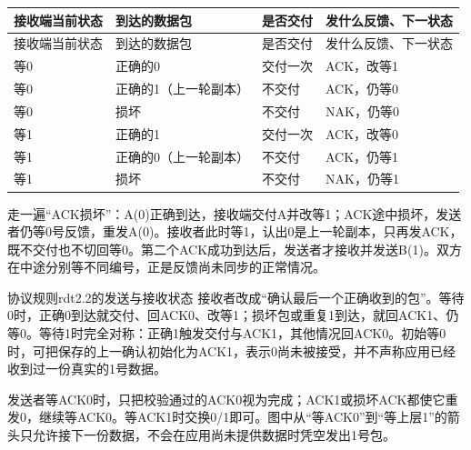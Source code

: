 \begingroup
\small\setlength{\tabcolsep}{3pt}
\renewcommand{\arraystretch}{1.22}
\begin{longtable}{@{}>{\raggedright\arraybackslash}p{}>{\raggedright\arraybackslash}p{}>{\raggedright\arraybackslash}p{}>{\raggedright\arraybackslash}p{}@{}}
\toprule
接收端当前状态 & 到达的数据包 & 是否交付 & 发什么反馈、下一状态 \\
\midrule\endfirsthead
接收端当前状态 & 到达的数据包 & 是否交付 & 发什么反馈、下一状态 \\
\midrule\endhead
\bottomrule\endfoot
等0 & 正确的0 & 交付一次 & ACK，改等1 \\
等0 & 正确的1（上一轮副本） & 不交付 & ACK，仍等0 \\
等0 & 损坏 & 不交付 & NAK，仍等0 \\
等1 & 正确的1 & 交付一次 & ACK，改等0 \\
等1 & 正确的0（上一轮副本） & 不交付 & ACK，仍等1 \\
等1 & 损坏 & 不交付 & NAK，仍等1 \\
\end{longtable}
\endgroup


走一遍“ACK损坏”：A(0)正确到达，接收端交付A并改等1；ACK途中损坏，发送者仍等0号反馈，重发A(0)。接收者此时等1，认出0是上一轮副本，只再发ACK，既不交付也不切回等0。第二个ACK成功到达后，发送者才接收并发送B(1)。双方在中途分别等不同编号，正是反馈尚未同步的正常情况。





\begin{StudyBlock}{协议规则}{rdt2.2的发送与接收状态}
接收者改成“确认最后一个正确收到的包”。等待0时，正确0到达就交付、回ACK0、改等1；损坏包或重复1到达，就回ACK1、仍等0。等待1时完全对称：正确1触发交付与ACK1，其他情况回ACK0。初始等0时，可把保存的上一确认初始化为ACK1，表示0尚未被接受，并不声称应用已经收到过一份真实的1号数据。


发送者等ACK0时，只把校验通过的ACK0视为完成；ACK1或损坏ACK都使它重发0，继续等ACK0。等ACK1时交换0/1即可。图中从“等ACK0”到“等上层1”的箭头只允许接下一份数据，不会在应用尚未提供数据时凭空发出1号包。
\end{StudyBlock}



